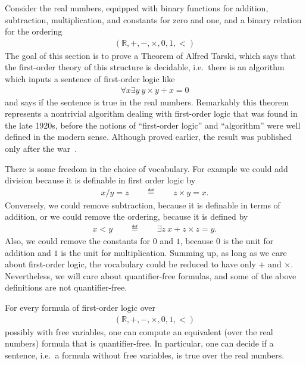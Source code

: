 \label{sec:tarski}
\newcommand{\bss}{\textsc{bss}\xspace}
\newcommand{\Real}{\mathbb R}
Consider the real numbers, equipped with binary functions for addition, subtraction, multiplication, and constants for zero and one, and a binary relation for the ordering
\begin{align*}
  (\Real, +, -, \times, 0, 1, <)
\end{align*}
The goal of this section is to prove a Theorem of Alfred Tarski, which says that the first-order theory of this structure is decidable, i.e.~there is an algorithm which inputs a sentence of first-order logic like
\begin{align*}
\forall x  \exists y \ y \times y + x = 0
\end{align*}
and says if the sentence is true in the real numbers. Remarkably this theorem represents a nontrivial algorithm dealing with first-order logic that was found in the late 1920s, before the notions of ``first-order logic'' and ``algorithm'' were well defined in the modern sense. Although proved earlier, the result was published only after the war~\cite{Tarski:1951vl}.

There is some freedom in the choice of vocabulary. For example we could add division because it is definable in first order logic by
\begin{align*}
  x / y = z \qquad \eqdef \qquad z \times y = x.
\end{align*}
Conversely, we could remove subtraction, because it is definable in terms of addition, or we could remove the ordering, because it is defined by
\begin{align*}
  x < y \qquad \eqdef \qquad \exists z \ x + z \times z = y.
\end{align*}
Also, we could remove the constants for $0$ and $1$, because $0$ is the unit for addition and $1$ is the unit for multiplication. Summing up, as long as we care about first-order logic, the vocabulary could be reduced to have only $+$ and $\times$. Nevertheless, we will care about quantifier-free formulas, and some of the above definitions are not quantifier-free.

\begin{theorem}\label{thm:tarski}
	For every formula of first-order logic over 
	\begin{align*}
  (\Real, +, -, \times, 0, 1, <)
\end{align*}
possibly with free variables, one can compute an equivalent (over the real numbers) formula that is quantifier-free. In particular, one can decide if a sentence, i.e.~a formula without free variables, is true over the real numbers.
\end{theorem}









